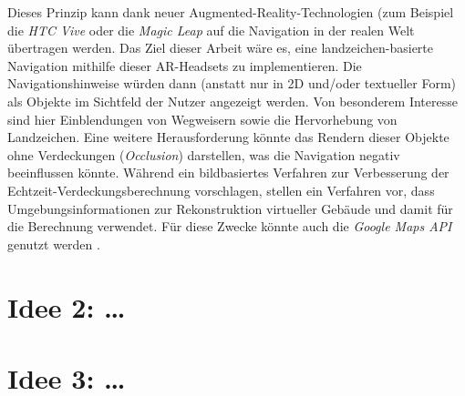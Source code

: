 \documentclass[a4paper]{scrartcl}
\begin{document}
Dieses Prinzip kann dank neuer Augmented-Reality-Technologien (zum Beispiel die \emph{HTC Vive} oder die \emph{Magic Leap} auf die Navigation in der realen Welt übertragen werden.
Das Ziel dieser Arbeit wäre es, eine landzeichen-basierte Navigation mithilfe dieser AR-Headsets zu implementieren.
Die Navigationshinweise würden dann (anstatt nur in 2D und/oder textueller Form) als Objekte im Sichtfeld der Nutzer angezeigt werden.
Von besonderem Interesse sind hier Einblendungen von Wegweisern sowie die Hervorhebung von Landzeichen.
Eine weitere Herausforderung könnte das Rendern dieser Objekte ohne Verdeckungen (\emph{Occlusion}) darstellen, was die Navigation negativ beeinflussen könnte.
Während \textcite{Walton2017} ein bildbasiertes Verfahren zur Verbesserung der Echtzeit-Verdeckungsberechnung vorschlagen, stellen \textcite{Kasperi2017} ein Verfahren vor, dass Umgebungsinformationen zur Rekonstruktion virtueller Gebäude und damit für die Berechnung verwendet.
Für diese Zwecke könnte auch die \emph{Google Maps API} genutzt werden \parencite{Google2018}.


\section*{Idee 2: \dots}

\lipsum[3-4]

\section*{Idee 3: \dots}

\lipsum[5-6]

\printbibliography[nottype=online]
\printbibliography[title={Online Referenzen}, type=online]
\end{document}
